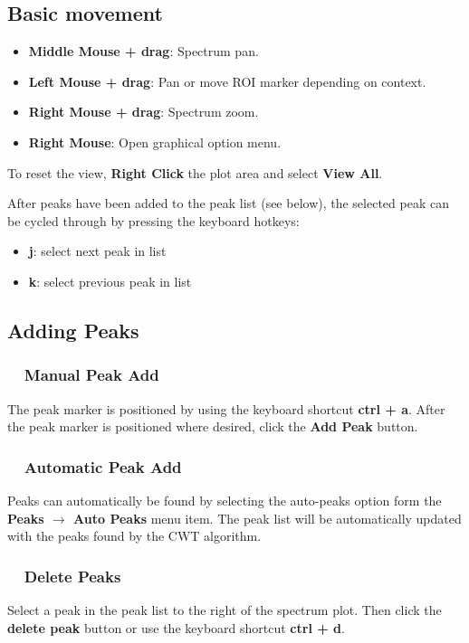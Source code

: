 \documentclass[10pt]{article}
\begin{document}
\subsection*{Basic movement}

\begin{itemize}
    \item \textbf{Middle Mouse + drag}:  Spectrum pan.
    \item \textbf{Left Mouse + drag}:  Pan or move ROI marker depending on context.
    \item \textbf{Right Mouse + drag}:  Spectrum zoom.
    \item \textbf{Right Mouse}: Open graphical option menu.
\end{itemize}
To reset the view, \textbf{Right Click} the plot area and select \textbf{View All}.

After peaks have been added to the peak list (see below), the selected peak can be
cycled through by pressing the keyboard hotkeys:
\begin{itemize}
    \item \textbf{j}: select next peak in list
    \item \textbf{k}: select previous peak in list
\end{itemize}

\subsection*{Adding Peaks}

\subsubsection*{\ \ Manual Peak Add}
The peak marker is positioned by using the keyboard shortcut \textbf{ctrl + a}.
After the peak marker is positioned where desired, click the \textbf{Add Peak} button.

\subsubsection*{\ \ Automatic Peak Add}
Peaks can automatically be found by selecting the auto-peaks option form the
\textbf{Peaks $\rightarrow$ Auto Peaks} menu item.  The peak list will be automatically updated
with the peaks found by the CWT algorithm.

\subsubsection*{\ \ Delete Peaks}
Select a peak in the peak list to the right of the spectrum plot.  Then click the
\textbf{delete peak} button or use the keyboard shortcut \textbf{ctrl + d}.
\end{document}
